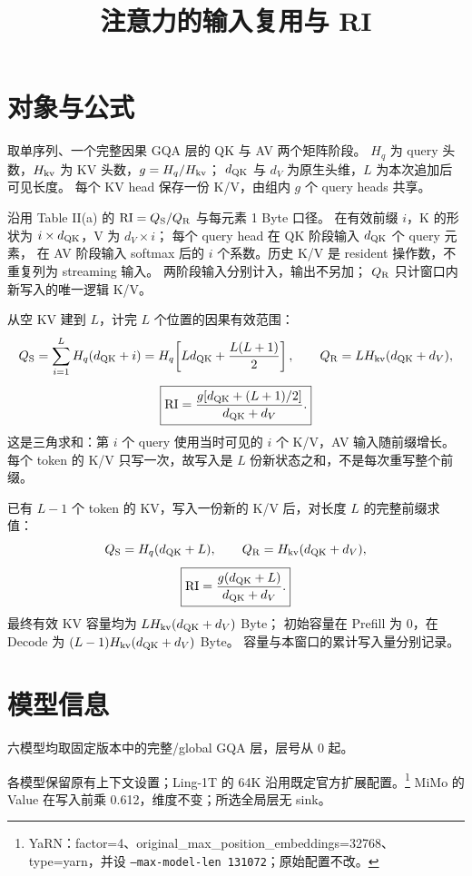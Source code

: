
\renewcommand{\WorkloadName}{注意力}
\title{\bfseries\WorkloadName 的输入复用与 RI}

\maketitle
\section{对象与公式}
取单序列、一个完整因果 GQA 层的 QK 与 AV 两个矩阵阶段。
$H_q$ 为 query 头数，$H_{\rm kv}$ 为 KV 头数，$g=H_q/H_{\rm kv}$；
$d_{\rm QK}$ 与 $d_V$ 为原生头维，$L$ 为本次追加后可见长度。
每个 KV head 保存一份 K/V，由组内 $g$ 个 query heads 共享。

沿用 Table II(a) 的 $\mathrm{RI}=Q_{\mathrm S}/Q_{\mathrm R}$ 与每元素 1 Byte 口径。
在有效前缀 $i$，K 的形状为 $i\times d_{\rm QK}$，V 为 $d_V\times i$；
每个 query head 在 QK 阶段输入 $d_{\rm QK}$ 个 query 元素，
在 AV 阶段输入 softmax 后的 $i$ 个系数。历史 K/V 是 resident 操作数，不重复列为 streaming 输入。
两阶段输入分别计入，输出不另加；
$Q_{\mathrm R}$ 只计窗口内新写入的唯一逻辑 K/V。

从空 KV 建到 $L$，计完 $L$ 个位置的因果有效范围：
\[
\begin{gathered}
Q_{\mathrm S}=\sum_{i=1}^{L}H_q(d_{\rm QK}+i)=H_q\!\left[Ld_{\rm QK}+\frac{L(L+1)}2\right],
\qquad Q_{\mathrm R}=LH_{\rm kv}(d_{\rm QK}+d_V),\\[4pt]
\boxed{\displaystyle\mathrm{RI}=\frac{g[d_{\rm QK}+(L+1)/2]}{d_{\rm QK}+d_V}.}
\end{gathered}
\]
这是三角求和：第 $i$ 个 query 使用当时可见的 $i$ 个 K/V，AV 输入随前缀增长。
每个 token 的 K/V 只写一次，故写入是 $L$ 份新状态之和，不是每次重写整个前缀。

已有 $L-1$ 个 token 的 KV，写入一份新的 K/V 后，对长度 $L$ 的完整前缀求值：
\[
\begin{gathered}
Q_{\mathrm S}=H_q(d_{\rm QK}+L),\qquad Q_{\mathrm R}=H_{\rm kv}(d_{\rm QK}+d_V),\\[4pt]
\boxed{\displaystyle\mathrm{RI}=\frac{g(d_{\rm QK}+L)}{d_{\rm QK}+d_V}.}
\end{gathered}
\]
最终有效 KV 容量均为 $LH_{\rm kv}(d_{\rm QK}+d_V)$ Byte；
初始容量在 Prefill 为 0，在 Decode 为 $(L-1)H_{\rm kv}(d_{\rm QK}+d_V)$ Byte。
容量与本窗口的累计写入量分别记录。

\section{模型信息}
六模型均取固定版本中的完整/global GQA 层，层号从 0 起。
\begin{center}\small\end{center}
各模型保留原有上下文设置；Ling-1T 的 64K 沿用既定官方扩展配置。\footnote{YaRN：factor=4、original\_max\_position\_embeddings=32768、type=yarn，并设 \texttt{--max-model-len 131072}；原始配置不改。}
MiMo 的 Value 在写入前乘 0.612，维度不变；所选全局层无 sink。

